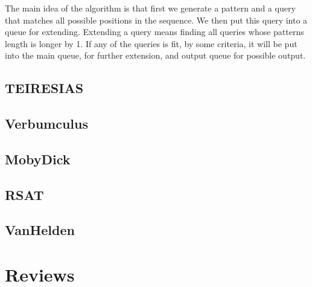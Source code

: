 The main idea of the algorithm is that first we generate a 
pattern and a query that matches all possible positions in 
the sequence. We then put this query into a queue for extending.
Extending a query means finding all queries whose patterns length
is longer by 1. If any of the queries is fit, by some criteria,
it will be put into the main queue, for further extension, 
and output queue for possible output.

\subsection{TEIRESIAS}

 \cite{TEIRESIAS}

\subsection{Verbumculus}

 \cite{Verbumculus}

\subsection{MobyDick}

 \cite{MobyDick}

\subsection{RSAT}

 \cite{RSAT}

\subsection{VanHelden}

 \cite{VanHelden}

\section{Reviews}

